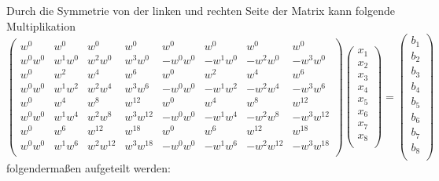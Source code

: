 Durch die Symmetrie von der linken und rechten Seite der Matrix kann folgende Multiplikation 
\begin{equation*}
\left( \begin{array}{cccccccc}
w^{0} & w^{0} & w^{0} & w^{0} & w^{0} & w^{0} & w^{0} & w^{0}\\
w^{0}w^{0} & w^{1}w^{0} & w^{2}w^{0} & w^{3}w^{0} & -w^{0}w^{0} & -w^{1}w^{0} & -w^{2}w^{0} & -w^{3}w^{0}\\
w^{0} & w^{2} & w^{4} & w^{6} & w^{0} & w^{2} & w^{4} & w^{6}\\
w^{0}w^{0} & w^{1}w^{2} & w^{2}w^{4} & w^{3}w^{6} & -w^{0}w^{0} & -w^{1}w^{2} & -w^{2}w^{4} & -w^{3}w^{6}\\
w^{0} & w^{4} & w^{8} & w^{12} & w^{0} & w^{4} & w^{8} & w^{12}\\
w^{0}w^{0} & w^{1}w^{4} & w^{2}w^{8} & w^{3}w^{12} & -w^{0}w^{0} & -w^{1}w^{4} & -w^{2}w^{8} & -w^{3}w^{12}\\
w^{0} & w^{6} & w^{12} & w^{18} & w^{0} & w^{6} & w^{12} & w^{18}\\
w^{0}w^{0} & w^{1}w^{6} & w^{2}w^{12} & w^{3}w^{18} & -w^{0}w^{0} & -w^{1}w^{6} & -w^{2}w^{12} & -w^{3}w^{18}\\
\end{array} \right)
\left( \begin{array}{cccccccc}
x_1\\
x_2\\
x_3\\
x_4\\
x_5\\
x_6\\
x_7\\
x_8\\
\end{array} \right)
=
\left( \begin{array}{cccccccc}
b_1\\
b_2\\
b_3\\
b_4\\
b_5\\
b_6\\
b_7\\
b_8\\
\end{array} \right)
\end{equation*}
folgendermaßen aufgeteilt werden:

